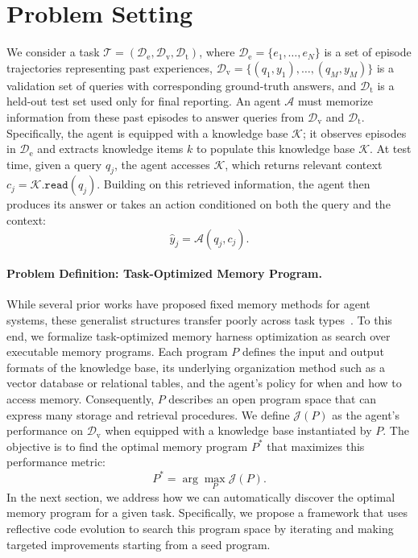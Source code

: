 
\section{Problem Setting}
\label{sec:problem-setting}

We consider a task $\mathcal{T} = (\mathcal{D}_\text{e}, \mathcal{D}_\text{v}, \mathcal{D}_\text{t})$, where $\mathcal{D}_\text{e} = \{e_1, \dots, e_N\}$ is a set of episode trajectories representing past experiences, $\mathcal{D}_\text{v} = \{(q_1, y_1), \dots, (q_M, y_M)\}$ is a validation set of queries with corresponding ground-truth answers, and $\mathcal{D}_\text{t}$ is a held-out test set used only for final reporting.
An agent $\mathcal{A}$ must memorize information from these past episodes to answer queries from $\mathcal{D}_\text{v}$ and $\mathcal{D}_\text{t}$.
Specifically, the agent is equipped with a knowledge base $\mathcal{K}$; it observes episodes in $\mathcal{D}_\text{e}$ and extracts knowledge items $k$ to populate this knowledge base $\mathcal{K}$.
At test time, given a query $q_j$, the agent accesses $\mathcal{K}$, which returns relevant context $c_j = \mathcal{K}.\texttt{read}(q_j)$.
Building on this retrieved information, the agent then produces its answer or takes an action conditioned on both the query and the context:
\begin{equation}
\hat{y}_j = \mathcal{A}(q_j, c_j).
\label{eq:inference}
\end{equation}

\paragraph{Problem Definition: Task-Optimized Memory Program.}
While several prior works have proposed fixed memory methods for agent systems, these generalist structures transfer poorly across task types~\citep{structmemeval}.
To this end, we formalize task-optimized memory harness optimization as search over executable memory programs.
Each program $P$ defines the input and output formats of the knowledge base, its underlying organization method such as a vector database or relational tables, and the agent's policy for when and how to access memory.
Consequently, $P$ describes an open program space that can express many storage and retrieval procedures.
We define $\mathcal{J}(P)$ as the agent's performance on $\mathcal{D}_\text{v}$ when equipped with a knowledge base instantiated by $P$.
The objective is to find the optimal memory program $P^*$ that maximizes this performance metric:
\begin{equation}
P^* = \arg\max_P \mathcal{J}(P).
\label{eq:objective}
\end{equation}
In the next section, we address how we can automatically discover the optimal memory program for a given task. Specifically, we propose a framework that uses reflective code evolution to search this program space by iterating and making targeted improvements starting from a seed program.
